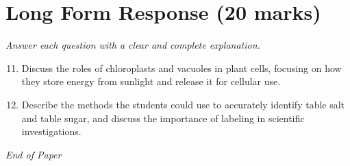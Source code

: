 \documentclass[12pt]{article}
\begin{document}
\section*{Long Form Response (20 marks)}
\textit{Answer each question with a clear and complete explanation.}
\begin{enumerate}[label=\arabic*.]
\setcounter{enumi}{10}
\item Discuss the roles of chloroplasts and vacuoles in plant cells, focusing on how they store energy from sunlight and release it for cellular use.
\item Describe the methods the students could use to accurately identify table salt and table sugar, and discuss the importance of labeling in scientific investigations.
\end{enumerate}

\vfill
\noindent\textit{End of Paper}
\end{document}
